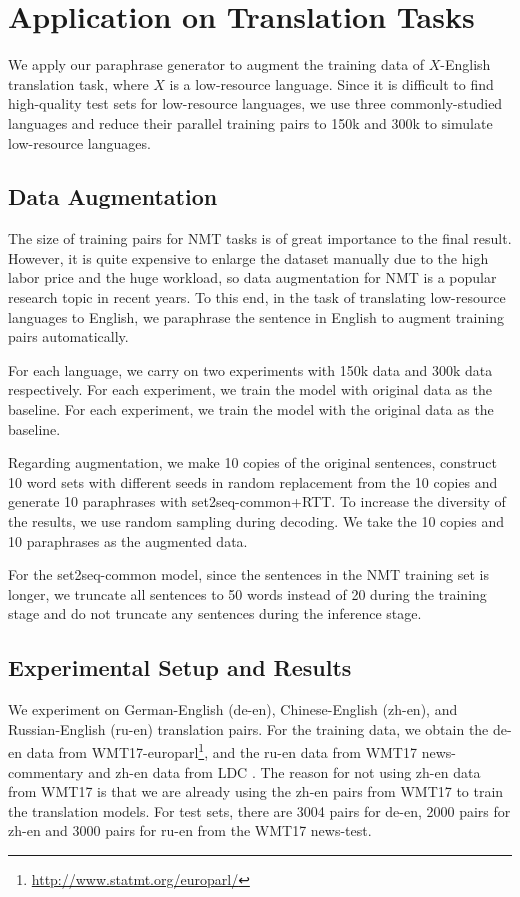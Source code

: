 \section{Application on Translation Tasks} \label{sec:app}
We apply our paraphrase generator to augment the training data of $X$-English 
translation task, where $X$ is a low-resource language. 
Since it is difficult to find high-quality test sets for low-resource 
languages, we use three commonly-studied languages and reduce their 
parallel training pairs to 150k and 300k to simulate low-resource languages. 

\subsection{Data Augmentation}
The size of training pairs for NMT tasks is of great importance to the final result. However, it is quite expensive to enlarge the dataset manually due to the high labor price and the huge workload, so data augmentation for NMT is a popular research topic in recent years. To this end, in the task of translating low-resource languages to English, we paraphrase the sentence in English to augment training pairs automatically.

For each language, we carry on two experiments with 150k data and 300k data respectively. For each experiment, we train the model with original data 
as the baseline. 
For each experiment, we train the model with the original
data as the baseline.

Regarding augmentation, we make 10 copies of the original sentences, 
construct 10 word sets with different seeds in random replacement from the 10 copies and generate 10 paraphrases 
with set2seq-common+RTT.
To increase the diversity of the results, 
we use random sampling \cite{edunov2018understanding} during decoding. 
We take the 10 copies and 10 paraphrases as the augmented data.

For the set2seq-common model, since the sentences 
in the NMT training set is longer, we truncate all sentences 
to 50 words instead of 20 during the training stage and 
do not truncate any sentences during the inference stage.

\subsection{Experimental Setup and Results}
We experiment on German-English (de-en), Chinese-English (zh-en), and Russian-English (ru-en) translation pairs. For the training data, 
we obtain the de-en data from WMT17-europarl\footnote{\url{http://www.statmt.org/europarl/}}\cite{koehn2005europarl}, and the ru-en data from WMT17 news-commentary and zh-en data from LDC \cite{liberman2002emotional,huang2002multiple}. The reason for not using zh-en data from WMT17 is that we are already using the zh-en pairs from WMT17 to train 
the translation models.
For test sets, there are 3004 pairs for de-en, 2000 pairs for zh-en and 
3000 pairs for ru-en from the WMT17 news-test.

